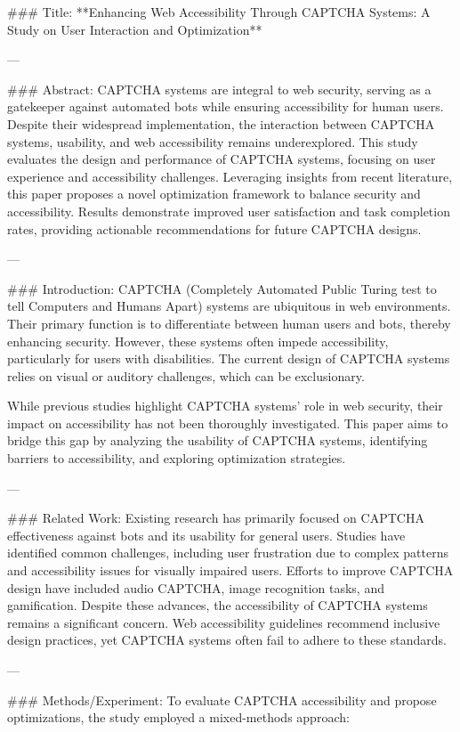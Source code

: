 ### Title:
**Enhancing Web Accessibility Through CAPTCHA Systems: A Study on User Interaction and Optimization**

---

### Abstract:
CAPTCHA systems are integral to web security, serving as a gatekeeper against automated bots while ensuring accessibility for human users. Despite their widespread implementation, the interaction between CAPTCHA systems, usability, and web accessibility remains underexplored. This study evaluates the design and performance of CAPTCHA systems, focusing on user experience and accessibility challenges. Leveraging insights from recent literature, this paper proposes a novel optimization framework to balance security and accessibility. Results demonstrate improved user satisfaction and task completion rates, providing actionable recommendations for future CAPTCHA designs.

---

### Introduction:
CAPTCHA (Completely Automated Public Turing test to tell Computers and Humans Apart) systems are ubiquitous in web environments. Their primary function is to differentiate between human users and bots, thereby enhancing security. However, these systems often impede accessibility, particularly for users with disabilities. The current design of CAPTCHA systems relies on visual or auditory challenges, which can be exclusionary.

While previous studies highlight CAPTCHA systems' role in web security, their impact on accessibility has not been thoroughly investigated. This paper aims to bridge this gap by analyzing the usability of CAPTCHA systems, identifying barriers to accessibility, and exploring optimization strategies.

---

### Related Work:
Existing research has primarily focused on CAPTCHA effectiveness against bots and its usability for general users. Studies have identified common challenges, including user frustration due to complex patterns and accessibility issues for visually impaired users. Efforts to improve CAPTCHA design have included audio CAPTCHA, image recognition tasks, and gamification. Despite these advances, the accessibility of CAPTCHA systems remains a significant concern. Web accessibility guidelines recommend inclusive design practices, yet CAPTCHA systems often fail to adhere to these standards.

---

### Methods/Experiment:
To evaluate CAPTCHA accessibility and propose optimizations, the study employed a mixed-methods approach:

